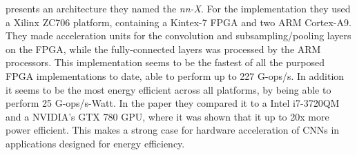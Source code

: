 \cite{Paper} presents an architecture they named the \textit{nn-X}. For the implementation they used a Xilinx ZC706 platform, containing a Kintex-7 FPGA and two ARM Cortex-A9. They made acceleration units for the convolution and subsampling/pooling layers on the FPGA, while the fully-connected layers was processed by the ARM processors. This implementation seems to be the fastest of all the purposed FPGA implementations to date, able to perform up to 227 G-ops/s. In addition it seems to be the most energy efficient across all platforms, by being able to perform 25 G-ops/s-Watt. In the paper they compared it to a Intel i7-3720QM and a NVIDIA’s GTX 780 GPU, where it was shown that it up to 20x more power efficient. This makes a strong case for hardware acceleration of CNNs in applications designed for energy efficiency. 


